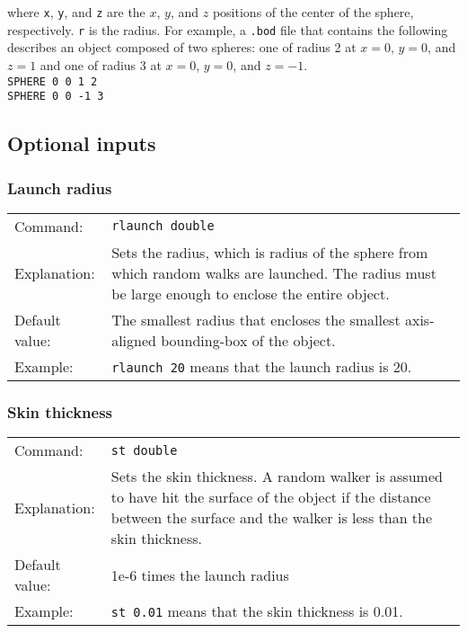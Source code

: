 \documentclass[12pt,letterpaper]{article}
\begin{document}
where \texttt{x}, \texttt{y}, and \texttt{z} are the $x$, $y$, and $z$ positions of the center of the sphere, respectively. \texttt{r} is the radius. For example, a \texttt{.bod} file that contains the following describes an object composed of two spheres: one of radius 2 at $x=0$, $y=0$, and $z=1$ and one of radius 3 at $x=0$, $y=0$, and $z=-1$.\\

\texttt{SPHERE 0 0 1 2} \\
\indent \texttt{SPHERE 0 0 -1 3}

\subsection{Optional inputs}
\label{sec:optinputs}

\subsubsection{Launch radius}
\begin{tabular}{p{1in} p{5.5in}}
Command: & \texttt{rlaunch double} \\ 
Explanation: & Sets the radius, which is radius of the sphere from which random walks are launched. The radius must be large enough to enclose the entire object. \\
Default value: & The smallest radius that encloses the smallest axis-aligned bounding-box of the object. \\ 
Example: & \texttt{rlaunch 20} means that the launch radius is 20.
\end{tabular}

\subsubsection{Skin thickness}
\begin{tabular}{p{1in} p{5in}}
Command: & \texttt{st double} \\ 
Explanation: & Sets the skin thickness. A random walker is assumed to have hit the surface of the object if the distance between the surface and the walker is less than the skin thickness. \\
Default value: & 1e-6 times the launch radius \\
Example: &\texttt{st 0.01} means that the skin thickness is 0.01.
\end{tabular}
\end{document}
